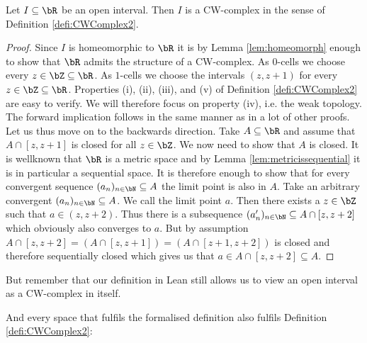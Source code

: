 \begin{example}
  Let $I \subseteq \bR$ be an open interval.
  Then $I$ is a CW-complex in the sense of Definition \ref{defi:CWComplex2}.
\end{example}
\begin{proof}
  Since $I$ is homeomorphic to $\bR$ it is by Lemma \ref{lem:homeomorph} enough to show that $\bR$ admits the structure of a CW-complex.
  As $0$-cells we choose every $z \in \bZ \subseteq \bR$.
  As $1$-cells we choose the intervals $(z, z + 1)$ for every $z \in \bZ \subseteq \bR$.
  Properties (i), (ii), (iii), and (v) of Definition \ref{defi:CWComplex2} are easy to verify.
  We will therefore focus on property (iv), i.e. the weak topology.
  The forward implication follows in the same manner as in a lot of other proofs.
  Let us thus move on to the backwards direction.
  Take $A \subseteq \bR$ and assume that $A \cap [z, z + 1]$ is closed for all $z \in \bZ$.
  We now need to show that $A$ is closed.
  It is wellknown that $\bR$ is a metric space and by Lemma \ref{lem:metricissequential} it is in particular a sequential space.
  It is therefore enough to show that for every convergent sequence $(a_n)_{n \in \bN} \subseteq A$ the limit point is also in $A$.
  Take an arbitrary convergent $(a_n)_{n \in \bN} \subseteq A$.
  We call the limit point $a$.
  Then there exists a $z \in \bZ$ such that $a \in (z, z + 2)$.
  Thus there is a subsequence $(a'_n)_{n \in \bN} \subseteq A \cap [z, z + 2]$ which obviously also converges to $a$.
  But by assumption $A \cap [z, z + 2] = (A \cap [z, z + 1]) = (A \cap [z + 1, z + 2])$ is closed and therefore sequentially closed which gives us that $a \in A \cap [z, z + 2] \subseteq A$.
\end{proof}

But remember that our definition in Lean still allows us to view an open interval as a CW-complex in itself.

And every space that fulfils the formalised definition also fulfils Definition \ref{defi:CWComplex2}:

